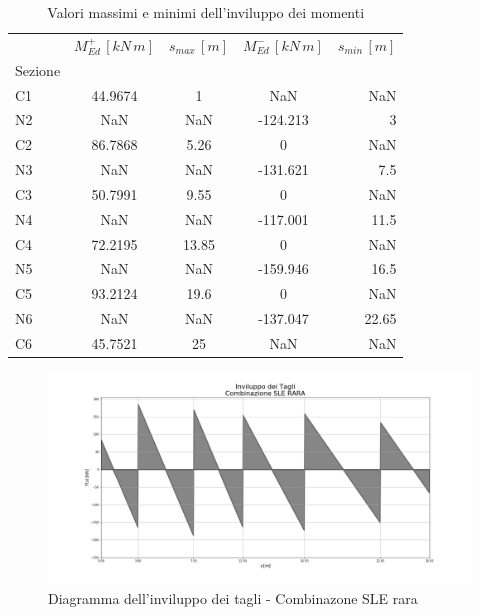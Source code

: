 \begin{table}
  	\centering
  	\caption{Valori massimi e minimi dell'inviluppo dei momenti}
  	\label{tab:max_min_bendingMomentEnvelope_sleRara}
  	\begin{tabular}{lcccr}
		\toprule
		& $M_{Ed}^+\,[kN\,m]$ & $s_{max}\,[m]$ & $M_{Ed}^-\,[kN\,m]$ & $s_{min}\,[m]$ \\
		Sezione &             &          &             &          \\
		\midrule
		C1      &     44.9674 &        1 &         NaN &      NaN \\
N2      &         NaN &      NaN &    -124.213 &        3 \\
C2      &     86.7868 &     5.26 &           0 &      NaN \\
N3      &         NaN &      NaN &    -131.621 &      7.5 \\
C3      &     50.7991 &     9.55 &           0 &      NaN \\
N4      &         NaN &      NaN &    -117.001 &     11.5 \\
C4      &     72.2195 &    13.85 &           0 &      NaN \\
N5      &         NaN &      NaN &    -159.946 &     16.5 \\
C5      &     93.2124 &     19.6 &           0 &      NaN \\
N6      &         NaN &      NaN &    -137.047 &    22.65 \\
C6      &     45.7521 &       25 &         NaN &      NaN \\
\bottomrule
	\end{tabular}
  \end{table}
  
\begin{figure}
	\centering
	\includegraphics[width=\textwidth]{../../export/img/shearEnvelope_sleRara}
	\caption{Diagramma dell'inviluppo dei tagli - Combinazone SLE rara}
\end{figure}

